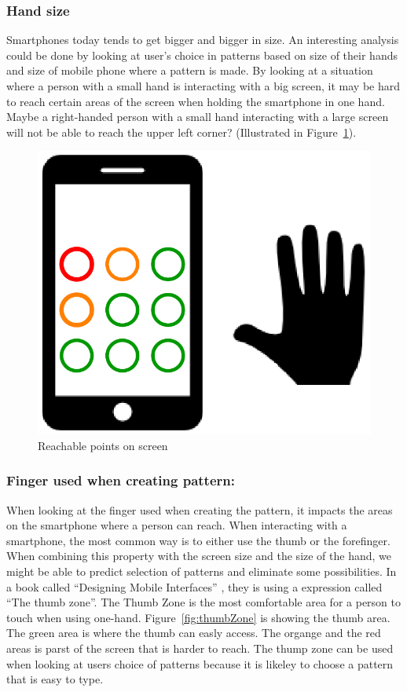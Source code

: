       \subsubsection*{Hand size} 
      Smartphones today tends to get bigger and bigger in size. An interesting analysis could be done by looking at user's choice in patterns based on size of their hands and size of mobile phone where a pattern is made. By looking at a situation where a person with a small hand is interacting with a big screen, it may be hard to reach certain areas of the screen when holding the smartphone in one hand. Maybe a right-handed person with a small hand interacting with a large screen will not be able to reach the upper left corner? (Illustrated in Figure~\ref{fig:reachablePoints}).

        \begin{figure}[H]
          \centering
          \includegraphics[scale=0.22]{pics/screenHand.png}
          \caption{Reachable points on screen}
          \label{fig:reachablePoints}
        \end{figure}

      \subsubsection*{Finger used when creating pattern:} When looking at the finger used when creating the pattern, it impacts the areas on the smartphone where a person can reach. When interacting with a smartphone, the most common way is to either use the thumb or the forefinger. When combining this property with the screen size and the size of the hand, we might be able to predict selection of patterns and eliminate some possibilities. In a book called ``Designing Mobile Interfaces'' \cite{Hoober}, they is using a expression called ``The thumb zone''. The Thumb Zone is the most comfortable area for a person to touch when using one-hand. Figure~\ref{fig:thumbZone} is showing the thumb area. The green area is where the thumb can easly access. The organge and the red areas is parst of the screen that is harder to reach. The thump zone can be used when looking at users choice of patterns because it is likeley to choose a pattern that is easy to type. 


